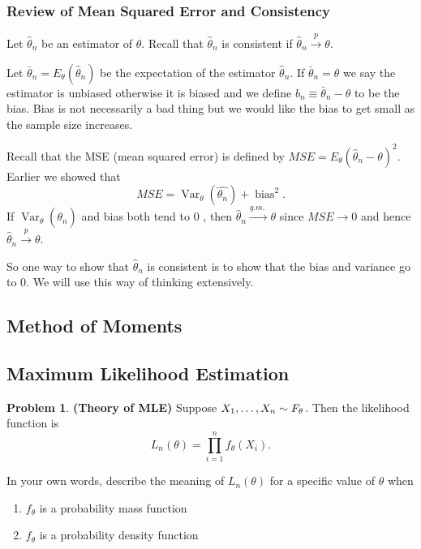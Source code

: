 \documentclass[13pt]{article}
\theoremstyle{definition}
\newtheorem{problem}[theorem]{Problem}
\theoremstyle{remark}
\begin{document}
\subsubsection{Review of Mean Squared Error and Consistency}
Let $\hat{\theta}_{n}$ be an estimator of $\theta$. Recall that $\hat{\theta}_{n}$ is consistent if $\hat{\theta}_{n} \stackrel{p}{\rightarrow} \theta$. 

Let $\bar{\theta}_{n}=E_{\theta}\left(\widehat{\theta}_{n}\right)$ be the expectation of the estimator $\widehat{\theta}_{n}$. If $\bar{\theta}_{n}=\theta$ we say the estimator is unbiased otherwise it is biased and we define $b_{n} \equiv \bar{\theta}_{n}-\theta$ to be the bias. Bias is not necessarily a bad thing but we would like the bias to get small as the sample size increases. 

Recall that the MSE (mean squared error) is defined by $M S E=E_{\theta}\left(\widehat{\theta}_{n}-\theta\right)^{2}$. Earlier we showed that
$$
M S E=\operatorname{Var}_{\theta}\left(\widehat{\theta_{n}}\right)+\operatorname{bias}^{2} .
$$
If $\operatorname{Var}_{\theta}\left(\widehat{\theta_{n}}\right)$ and bias both tend to 0 , then $\widehat{\theta}_{n} \stackrel{q . m \text {. }}{\rightarrow} \theta$  since $MSE\to 0$ and hence $\widehat{\theta}_{n} \stackrel{p}{\rightarrow} \theta$. 

{\color{C3} So one way to show that $\widehat{\theta}_{n}$ is consistent is to show that the bias and variance go to 0. We will use this way of thinking extensively.}




\subsection{Method of Moments}

\subsection{Maximum Likelihood Estimation}
\begin{problem}\textbf{(Theory of MLE)}
    Suppose $X_1, \ldots, X_n \sim F_\theta\mkern1mu$. 
    Then the likelihood function is 
    \begin{equation*}
        L_n(\theta) = \prod_{i=1}^{n} f_\theta(X_i).
    \end{equation*}

    In your own words, describe the meaning of $L_n(\theta)$ for a specific value of $\theta$ when 
    \begin{enumerate}[label=(\alph*),topsep=0pt]
        \item $f_\theta$ is a probability mass function
        \item $f_\theta$ is a probability density function
    \end{enumerate}
\end{problem}
\end{document}
